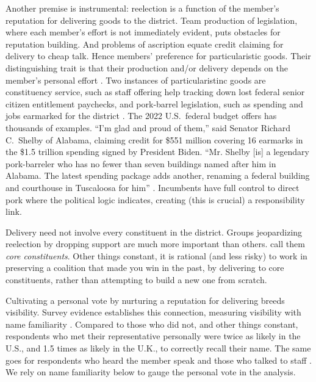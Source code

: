 \documentclass[letter,12pt]{article}
\begin{document}
Another premise is instrumental: reelection is a function of the member's reputation for delivering goods to the district. Team production of legislation, where each member's effort is not immediately evident, puts obstacles for reputation building. And problems of ascription equate credit claiming for delivery to cheap talk. Hence members' preference for particularistic goods. Their distinguishing trait is that their production and/or delivery depends on the member's personal effort \citep{haggard.mccubbins.2001}. Two instances of particularistinc goods are constituency service, such as staff offering help tracking down lost federal senior citizen entitlement paychecks, and pork-barrel legislation, such as spending and jobs earmarked for the district \citep{cain.etal.1987}. The 2022 U.S.\ federal budget offers has thousands of examples. ``I'm glad and proud of them,'' said Senator Richard C.\ Shelby of Alabama, claiming credit for \$551 million covering 16 earmarks in the \$1.5 trillion spending signed by President Biden. ``Mr. Shelby [is] a legendary pork-barreler who has no fewer than seven buildings named after him in Alabama. The latest spending package adds another, renaming a federal building and courthouse in Tuscaloosa for him'' \citep{nyt-pork.2022}. Incumbents have full control to direct pork where the political logic indicates, creating (this is crucial) a responsibility link.


Delivery need not involve every constituent in the district. Groups jeopardizing reelection by dropping support are much more important than others. \citet{cox.mccubbins.1986} call them \emph{core constituents}. Other things constant, it is rational (and less risky) to work in preserving a coalition that made you win in the past, by delivering to core constituents, rather than attempting to build a new one from scratch.

Cultivating a personal vote by nurturing a reputation for delivering breeds visibility. Survey evidence establishes this connection, measuring visibility with name familiarity \citep{abramowitz1975name-familiarity}. Compared to those who did not, and other things constant, respondents who met their representative personally were twice as likely in the U.S., and 1.5 times as likely in the U.K., to correctly recall their name. The same goes for respondents who heard the member speak and those who talked to staff \citep[][:34]{cain.etal.1987}. We rely on name familiarity below to gauge the personal vote in the analysis. 
\end{document}
